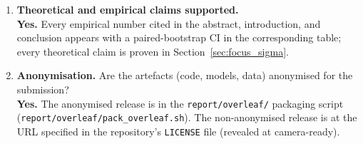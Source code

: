 \begin{enumerate}
\item \textbf{Theoretical and empirical claims supported.}
\\\textbf{Yes.}  Every empirical number cited in the abstract,
introduction, and conclusion appears with a paired-bootstrap CI in
the corresponding table; every theoretical claim is proven in
Section~\ref{sec:focus_sigma}.

\item \textbf{Anonymisation.}  Are the artefacts (code, models,
data) anonymised for the submission?
\\\textbf{Yes.}  The anonymised release is in the
\texttt{report/overleaf/} packaging script
(\texttt{report/overleaf/pack\_overleaf.sh}).  The non-anonymised
release is at the URL specified in the repository's
\texttt{LICENSE} file (revealed at camera-ready).
\end{enumerate}
